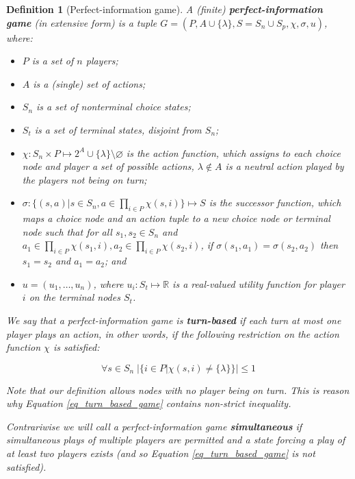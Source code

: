 \newtheorem*{defgpig}{Definition}
\begin{defgpig}[Perfect-information game]

A (finite) \textbf{perfect-information game} (in extensive form) is a tuple $G =
(P,A\cup\{\lambda\},S=S_n\cup S_p,\chi,\sigma,u)$, where:

\begin{itemize}

\item $P$ is a set of $n$ players;

\item $A$ is a (single) set of actions;

\item $S_n$ is a set of nonterminal choice states;

\item $S_t$ is a set of terminal states, disjoint from $S_n$;

\item $\chi: S_n \times P \mapsto 2^A \cup \{\lambda\} \setminus \varnothing$ is the action 
 function, which assigns to each choice node and player a set of possible actions, $\lambda \notin
 A$ is a neutral action played by the players not being on turn;

\item $\sigma: \{(s,a)| s \in S_n, a \in \prod\limits_{i\in P}\chi(s,i)\} \mapsto S$ is the
successor function, which maps a choice node and an action tuple to a new choice node or
terminal node such that for all $s_1, s_2 \in S_n$ and $a_1 \in \prod\limits_{i\in
P}\chi(s_1,i), a_2 \in \prod\limits_{i\in P}\chi(s_2,i)$, if 
$\sigma(s_1,a_1) = \sigma(s_2,a_2)$ then $s_1=s_2$ and $a_1=a_2$; and

\item $u = (u_1,\ldots,u_n)$, where $u_i: S_t \mapsto \mathbb{R}$ is a real-valued utility
function for player $i$ on the terminal nodes $S_t$.

\end{itemize}

We say that a perfect-information game is \textbf{turn-based} if each turn at most one player
plays an action, in other words, if the following restriction on the action function $\chi$ is satisfied:

\begin{equation}
\label{eq_turn_based_game}
\forall s \in S_n \; |\{i \in P|\chi(s,i) \not= \{\lambda\}\}| \le 1
\end{equation}

Note that our definition allows nodes with no player being on turn. This is reason why Equation
\ref{eq_turn_based_game} contains non-strict inequality.

Contrariwise we will call a perfect-information game \textbf{simultaneous} if simultaneous
plays of multiple players are permitted and a state forcing a play of at least two players
exists (and so Equation \ref{eq_turn_based_game} is not satisfied).

\end{defgpig}

